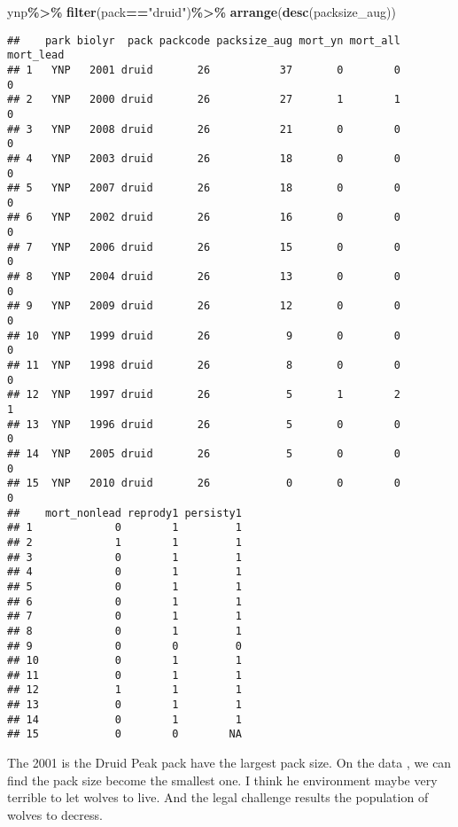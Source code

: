 \documentclass[
]{article}
\newenvironment{Shaded}{\begin{snugshade}}{\end{snugshade}}
\newcommand{\FunctionTok}[1]{\textcolor[rgb]{0.13,0.29,0.53}{\textbf{#1}}}
\newcommand{\NormalTok}[1]{#1}
\newcommand{\SpecialCharTok}[1]{\textcolor[rgb]{0.81,0.36,0.00}{\textbf{#1}}}
\newcommand{\StringTok}[1]{\textcolor[rgb]{0.31,0.60,0.02}{#1}}
\begin{document}
\begin{Shaded}
\begin{Highlighting}[]
\NormalTok{ynp}\SpecialCharTok{\%\textgreater{}\%}
  \FunctionTok{filter}\NormalTok{(pack}\SpecialCharTok{==}\StringTok{"druid"}\NormalTok{)}\SpecialCharTok{\%\textgreater{}\%}
  \FunctionTok{arrange}\NormalTok{(}\FunctionTok{desc}\NormalTok{(packsize\_aug))}
\end{Highlighting}
\end{Shaded}

\begin{verbatim}
##    park biolyr  pack packcode packsize_aug mort_yn mort_all mort_lead
## 1   YNP   2001 druid       26           37       0        0         0
## 2   YNP   2000 druid       26           27       1        1         0
## 3   YNP   2008 druid       26           21       0        0         0
## 4   YNP   2003 druid       26           18       0        0         0
## 5   YNP   2007 druid       26           18       0        0         0
## 6   YNP   2002 druid       26           16       0        0         0
## 7   YNP   2006 druid       26           15       0        0         0
## 8   YNP   2004 druid       26           13       0        0         0
## 9   YNP   2009 druid       26           12       0        0         0
## 10  YNP   1999 druid       26            9       0        0         0
## 11  YNP   1998 druid       26            8       0        0         0
## 12  YNP   1997 druid       26            5       1        2         1
## 13  YNP   1996 druid       26            5       0        0         0
## 14  YNP   2005 druid       26            5       0        0         0
## 15  YNP   2010 druid       26            0       0        0         0
##    mort_nonlead reprody1 persisty1
## 1             0        1         1
## 2             1        1         1
## 3             0        1         1
## 4             0        1         1
## 5             0        1         1
## 6             0        1         1
## 7             0        1         1
## 8             0        1         1
## 9             0        0         0
## 10            0        1         1
## 11            0        1         1
## 12            1        1         1
## 13            0        1         1
## 14            0        1         1
## 15            0        0        NA
\end{verbatim}

The 2001 is the Druid Peak pack have the largest pack size. On the data
, we can find the pack size become the smallest one. I think he
environment maybe very terrible to let wolves to live. And the legal
challenge results the population of wolves to decress.
\end{document}
